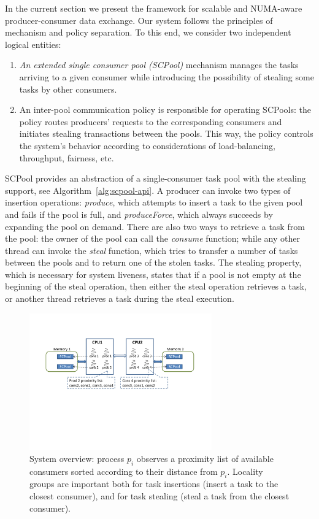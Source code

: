 In the current section we present the framework for scalable and NUMA-aware producer-consumer data exchange. 
Our system follows the principles of mechanism and policy separation.
To this end, we consider two independent logical entities: 
\begin{enumerate}
	\item \emph{An extended single consumer pool (SCPool)} mechanism manages the tasks arriving to a given consumer while introducing the possibility of stealing some tasks by other consumers.
	\item An inter-pool communication policy is responsible for operating SCPools: the policy routes producers' requests to the corresponding consumers and initiates stealing transactions between the pools. This way, the policy controls the system's behavior according to considerations of load-balancing, throughput, fairness, etc.
\end{enumerate} 



SCPool provides an abstraction of a single-consumer task pool with the stealing support, see Algorithm~\ref{alg:scpool-api}.
A producer can invoke two types of insertion operations: \emph{produce}, which attempts to insert a task to the given pool and fails if the pool is full, and \emph{produceForce}, which always succeeds by expanding the pool on demand.
There are also two ways to retrieve a task from the pool: the owner of the pool can call the \emph{consume} function; while any other thread can invoke the \emph{steal} function, which tries to transfer a number of tasks between the pools and to return one of the stolen tasks. The stealing property, which is necessary for system liveness, states that
if a pool is not empty at the beginning of the steal operation, then either the steal operation retrieves a task, or another thread retrieves a task during the steal execution.

\begin{figure}[htb]
	\centering
	\includegraphics[width=0.7\textwidth]{system-fig}
	\caption{\footnotesize{System overview: process $p_i$ observes a proximity list of available consumers sorted according to their distance from $p_i$. Locality groups are important both for task insertions (insert a task to the closest consumer), and for task stealing (steal a task from the closest consumer).}}
	\label{fig:system-fig}
\end{figure}


